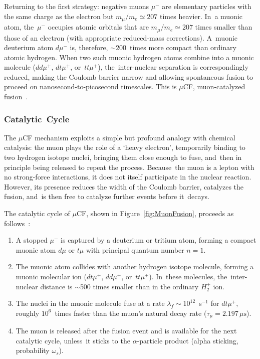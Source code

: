 \documentclass[particles,article,accept,pdftex,moreauthors]{Definitions/mdpi}
\begin{document}
Returning to the first strategy: negative muons $\mu^-$ are elementary particles with the same charge as the electron but $m_\mu/m_e\simeq 207$ times heavier. In~a muonic atom, the~$\mu^-$ occupies atomic orbitals that are $m_\mu/m_e\simeq 207$ times smaller than those of an electron (with appropriate reduced-mass corrections). A~muonic deuterium atom $d\mu^-$ is, therefore, $\sim$200~times more compact than ordinary atomic hydrogen. When two such muonic hydrogen atoms combine into a muonic molecule ($dd\mu^+$, $dt\mu^+$, or~$tt\mu^+$), the~inter-nuclear separation is correspondingly reduced, making the Coulomb barrier narrow and allowing spontaneous fusion to proceed on nanosecond-to-picosecond timescales. This is $\mu$CF, muon-catalyzed fusion~\cite{Rafelski:1987Jones,Rafelski:1990gg,Rafelski:1990in}.

\subsubsection{Catalytic~Cycle}\label{sssec:muCFcycle}
The $\mu$CF mechanism exploits a simple but profound analogy with chemical catalysis: the muon plays the role of a `heavy electron', temporarily binding to two hydrogen isotope nuclei, bringing them close enough to fuse, and~then in principle being released to repeat the process. Because~the muon is a lepton with no strong-force interactions, it does not itself participate in the nuclear reaction. However, its presence reduces the width of the Coulomb barrier, catalyzes the fusion, and~is then free to catalyze further events before it~decays.

The catalytic cycle of $\mu$CF, shown in Figure~\ref{fig:MuonFusion}, proceeds as follows~\cite{Rafelski:1987Jones,Rafelski:1990in}:
\begin{enumerate}
\item[(1)] A stopped $\mu^-$ is captured by a deuterium or tritium atom, forming a compact muonic atom $d\mu$ or $t\mu$ with principal quantum number $n=1$.
\item[(2)] The muonic atom collides with another hydrogen isotope molecule, forming a muonic molecular ion ($dt\mu^+$, $dd\mu^+$, or~$tt\mu^+$). In~these molecules, the~inter-nuclear distance is $\sim$500 times smaller than in the ordinary $H_2^+$ ion.
\item[(3)] The nuclei in the muonic molecule fuse at a rate $\lambda_f\sim 10^{12}$~s${}^{-1}$ for $dt\mu^+$, roughly $10^6$~times faster than the muon's natural decay rate ($\tau_\mu = 2.197\,\mu\mathrm{s}$).
\item[(4)] The muon is released after the fusion event and is available for the next catalytic cycle, unless~it sticks to the $\alpha$-particle product (alpha sticking, probability $\omega_s$).
\end{enumerate}
\end{document}
